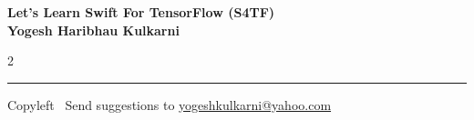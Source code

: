 \documentclass[8pt,landscape]{article}
\begin{document}
\footnotesize


\begin{center}
\Large{\textbf{Let's Learn Swift For TensorFlow (S4TF)\\ Yogesh Haribhau Kulkarni}}  
\end{center}

\begin{multicols}{2}

\end{multicols}

\rule{\linewidth}{0.25pt}
\scriptsize
Copyleft \textcopyleft\  Send suggestions to 
\href{http://www.yogeshkulkarni.com}{yogeshkulkarni@yahoo.com}
\end{document}
